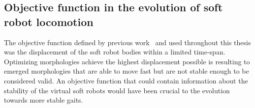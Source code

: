 \subsection*{Objective function in the evolution of soft robot locomotion}

The objective function defined by previous work~\citep{cheney2013unshackling} and used throughout this thesis was the displacement of the soft robot bodies within a limited time-span. Optimizing morphologies achieve the highest displacement possible is resulting to emerged morphologies that are able to move fast but are not stable enough to be considered valid. An objective function that could contain information about the stability of the virtual soft robots would have been crucial to the evolution towards more stable gaits.